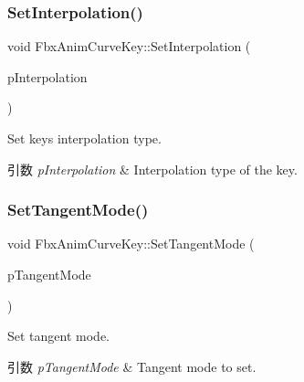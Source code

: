 \subsubsection{\texorpdfstring{Set\+Interpolation()}{SetInterpolation()}}
{\footnotesize\ttfamily void Fbx\+Anim\+Curve\+Key\+::\+Set\+Interpolation (\begin{DoxyParamCaption}\item[{\hyperlink{class_fbx_anim_curve_def_add2ab7d10d856ab0868cc9b143d59ea5}{Fbx\+Anim\+Curve\+Def\+::\+E\+Interpolation\+Type}}]{p\+Interpolation }\end{DoxyParamCaption})}

Set key\textquotesingle{}s interpolation type. 
\begin{DoxyParams}{引数}
{\em p\+Interpolation} & Interpolation type of the key. \\
\hline
\end{DoxyParams}
\mbox{\label{class_fbx_anim_curve_key_a8a8a090694fc042e9b234e40918faf8e}} 
\subsubsection{\texorpdfstring{Set\+Tangent\+Mode()}{SetTangentMode()}}
{\footnotesize\ttfamily void Fbx\+Anim\+Curve\+Key\+::\+Set\+Tangent\+Mode (\begin{DoxyParamCaption}\item[{\hyperlink{class_fbx_anim_curve_def_ac810ccc5ca0527704ab5175479964b87}{Fbx\+Anim\+Curve\+Def\+::\+E\+Tangent\+Mode}}]{p\+Tangent\+Mode }\end{DoxyParamCaption})}

Set tangent mode. 
\begin{DoxyParams}{引数}
{\em p\+Tangent\+Mode} & Tangent mode to set. \\
\hline
\end{DoxyParams}
\mbox{\label{class_fbx_anim_curve_key_a758b05baef1e6298833b1ed9e6c11a3e}} 
